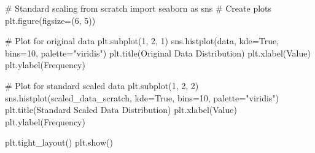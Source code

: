 \documentclass[
  letterpaper,
  DIV=11,
  numbers=noendperiod]{scrreprt}
\newenvironment{Shaded}{\begin{snugshade}}{\end{snugshade}}
\newcommand{\CommentTok}[1]{\textcolor[rgb]{0.37,0.37,0.37}{#1}}
\newcommand{\DecValTok}[1]{\textcolor[rgb]{0.68,0.00,0.00}{#1}}
\newcommand{\ImportTok}[1]{\textcolor[rgb]{0.00,0.46,0.62}{#1}}
\newcommand{\NormalTok}[1]{\textcolor[rgb]{0.00,0.23,0.31}{#1}}
\newcommand{\OperatorTok}[1]{\textcolor[rgb]{0.37,0.37,0.37}{#1}}
\newcommand{\StringTok}[1]{\textcolor[rgb]{0.13,0.47,0.30}{#1}}
\newcommand{\VariableTok}[1]{\textcolor[rgb]{0.07,0.07,0.07}{#1}}
\theoremstyle{plain}
\theoremstyle{definition}
\theoremstyle{remark}
\begin{document}
\begin{Shaded}
\begin{Highlighting}[]
\CommentTok{\# Standard scaling from scratch}
\ImportTok{import}\NormalTok{ seaborn }\ImportTok{as}\NormalTok{ sns}
\CommentTok{\# Create plots}
\NormalTok{plt.figure(figsize}\OperatorTok{=}\NormalTok{(}\DecValTok{6}\NormalTok{, }\DecValTok{5}\NormalTok{))}

\CommentTok{\# Plot for original data}
\NormalTok{plt.subplot(}\DecValTok{1}\NormalTok{, }\DecValTok{2}\NormalTok{, }\DecValTok{1}\NormalTok{)}
\NormalTok{sns.histplot(data, kde}\OperatorTok{=}\VariableTok{True}\NormalTok{, bins}\OperatorTok{=}\DecValTok{10}\NormalTok{, palette}\OperatorTok{=}\StringTok{"viridis"}\NormalTok{)}
\NormalTok{plt.title(}\StringTok{\textquotesingle{}Original Data Distribution\textquotesingle{}}\NormalTok{)}
\NormalTok{plt.xlabel(}\StringTok{\textquotesingle{}Value\textquotesingle{}}\NormalTok{)}
\NormalTok{plt.ylabel(}\StringTok{\textquotesingle{}Frequency\textquotesingle{}}\NormalTok{)}

\CommentTok{\# Plot for standard scaled data}
\NormalTok{plt.subplot(}\DecValTok{1}\NormalTok{, }\DecValTok{2}\NormalTok{, }\DecValTok{2}\NormalTok{)}
\NormalTok{sns.histplot(scaled\_data\_scratch, kde}\OperatorTok{=}\VariableTok{True}\NormalTok{, bins}\OperatorTok{=}\DecValTok{10}\NormalTok{, palette}\OperatorTok{=}\StringTok{"viridis"}\NormalTok{)}
\NormalTok{plt.title(}\StringTok{\textquotesingle{}Standard Scaled Data Distribution\textquotesingle{}}\NormalTok{)}
\NormalTok{plt.xlabel(}\StringTok{\textquotesingle{}Value\textquotesingle{}}\NormalTok{)}
\NormalTok{plt.ylabel(}\StringTok{\textquotesingle{}Frequency\textquotesingle{}}\NormalTok{)}

\NormalTok{plt.tight\_layout()}
\NormalTok{plt.show()}
\end{Highlighting}
\end{Shaded}
\end{document}
